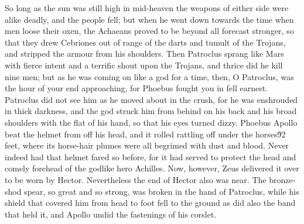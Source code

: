 {So long as the sun was still high in mid-heaven the weapons of either side were alike deadly, and the people fell; but when he went down towards the time when men loose their oxen, the Achaeans proved to be beyond all forecast stronger, so that they drew Cebriones out of range of the darts and tumult of the Trojans, and stripped the armour from his shoulders. Then Patroclus sprang like Mars with fierce intent and a terrific shout upon the Trojans, and thrice did he kill nine men; but as he was coming on like a god for a time, then, O Patroclus, was the hour of your end approaching, for Phoebus fought you in fell earnest. Patroclus did not see him as he moved about in the crush, for he was enshrouded in thick darkness, and the god struck him from behind on his back and his broad shoulders with the flat of his hand, so that his eyes turned dizzy. Phoebus Apollo beat the helmet from off his head, and it rolled rattling off under the horses\'92 feet, where its horse-hair plumes were all begrimed with dust and blood. Never indeed had that helmet fared so before, for it had served to protect the head and comely forehead of the godlike hero Achilles. Now, however, Zeus delivered it over to be worn by Hector. Nevertheless the end of Hector also was near. The bronze-shod spear, so great and so strong, was broken in the hand of Patroclus, while his shield that covered him from head to foot fell to the ground as did also the band that held it, and Apollo undid the fastenings of his corslet.\
}

